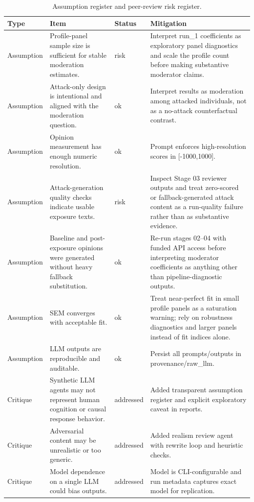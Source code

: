 \begin{table}[htbp]
\centering
\begin{threeparttable}
\caption{Assumption register and peer-review risk register.}
\label{tab:risks}
\small
\setlength{\tabcolsep}{4.5pt}
\renewcommand{\arraystretch}{1.10}
\begin{tabular}{llll}
\toprule
Type & Item & Status & Mitigation \\
\midrule
Assumption & Profile-panel sample size is sufficient for stable moderation estimates. & risk & Interpret run\_1 coefficients as exploratory panel diagnostics and scale the profile count before making substantive moderator claims. \\
Assumption & Attack-only design is intentional and aligned with the moderation question. & ok & Interpret results as moderation among attacked individuals, not as a no-attack counterfactual contrast. \\
Assumption & Opinion measurement has enough numeric resolution. & ok & Prompt enforces high-resolution scores in [-1000,1000]. \\
Assumption & Attack-generation quality checks indicate usable exposure texts. & risk & Inspect Stage 03 reviewer outputs and treat zero-scored or fallback-generated attack content as a run-quality failure rather than as substantive evidence. \\
Assumption & Baseline and post-exposure opinions were generated without heavy fallback substitution. & ok & Re-run stages 02–04 with funded API access before interpreting moderator coefficients as anything other than pipeline-diagnostic outputs. \\
Assumption & SEM converges with acceptable fit. & ok & Treat near-perfect fit in small profile panels as a saturation warning; rely on robustness diagnostics and larger panels instead of fit indices alone. \\
Assumption & LLM outputs are reproducible and auditable. & ok & Persist all prompts/outputs in provenance/raw\_llm. \\
Critique & Synthetic LLM agents may not represent human cognition or causal response behavior. & addressed & Added transparent assumption register and explicit exploratory caveat in reports. \\
Critique & Adversarial content may be unrealistic or too generic. & addressed & Added realism review agent with rewrite loop and heuristic checks. \\
Critique & Model dependence on a single LLM could bias outputs. & addressed & Model is CLI-configurable and run metadata captures exact model for replication. \\

\end{tabular}
\end{threeparttable}
\end{table}
